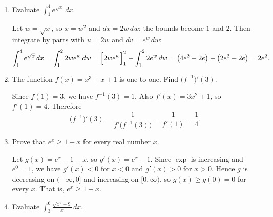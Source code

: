 \documentclass[12pt,letterpaper]{article}
\begin{document}
\begin{enumerate}[label=\textbf{\arabic*.},leftmargin=2em,itemsep=1.25em]
    \begin{solution}
      Let $x=2\sin\theta$ with $-\frac\pi2<\theta<\frac\pi2$. Then
      $dx=2\cos\theta\,d\theta$ and $\sqrt{4-x^2}=2\cos\theta$, so
      \[
        \int\frac{dx}{x^2\sqrt{4-x^2}}
        =\int\frac{2\cos\theta}{4\sin^2\theta\cdot2\cos\theta}\,d\theta
        =\frac14\int\csc^2\theta\,d\theta
        =-\frac14\cot\theta+C.
      \]
      Since $\sin\theta=\frac x2$ and $\cos\theta=\frac{\sqrt{4-x^2}}{2}$,
      $\cot\theta=\frac{\sqrt{4-x^2}}{x}$, and the answer is
      \[
        -\frac{\sqrt{4-x^2}}{4x}+C.
      \]
    \end{solution}

  \item Evaluate $\displaystyle\int_1^4 e^{\sqrt x}\,dx$.


    \begin{solution}
      Let $w=\sqrt x$, so $x=w^2$ and $dx=2w\,dw$; the bounds become $1$
      and $2$. Then integrate by parts with $u=2w$ and $dv=e^w\,dw$:
      \[
        \int_1^4 e^{\sqrt x}\,dx=\int_1^2 2we^w\,dw
        =\Bigl[2we^w\Bigr]_1^2-\int_1^2 2e^w\,dw
        =\bigl(4e^2-2e\bigr)-\bigl(2e^2-2e\bigr)=2e^2.
      \]
    \end{solution}

  \item The function $f(x)=x^3+x+1$ is one-to-one. Find
    $\bigl(f^{-1}\bigr)'(3)$.

    \begin{solution}
      Since $f(1)=3$, we have $f^{-1}(3)=1$. Also $f'(x)=3x^2+1$, so
      $f'(1)=4$. Therefore
      \[
        \bigl(f^{-1}\bigr)'(3)=\frac{1}{f'\bigl(f^{-1}(3)\bigr)}
        =\frac{1}{f'(1)}=\frac14.
      \]
    \end{solution}

  \item Prove that $e^x\ge 1+x$ for every real number $x$.

    \begin{solution}
      Let $g(x)=e^x-1-x$, so $g'(x)=e^x-1$. Since $\exp$ is increasing and
      $e^0=1$, we have $g'(x)<0$ for $x<0$ and $g'(x)>0$ for $x>0$. Hence $g$
      is decreasing on $(-\infty,0]$ and increasing on $[0,\infty)$, so
      $g(x)\ge g(0)=0$ for every $x$. That is, $e^x\ge1+x$.
    \end{solution}

  \item Evaluate $\displaystyle\int_3^6\frac{\sqrt{x^2-9}}{x}\,dx$.


\end{enumerate}
\end{document}
